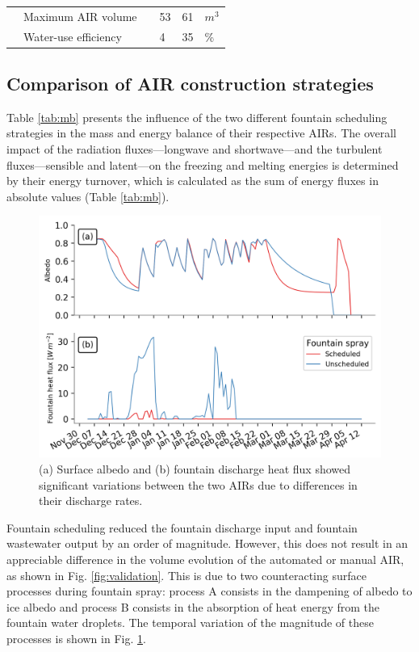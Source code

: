 \documentclass[tc, manuscript]{copernicus}
\begin{document}
\begin{table}
\begin{tabular}{@{}|llllll|@{}}
		                       & Maximum AIR volume              &                 & 53            & 61            & $m^{3}$ \\
		\multicolumn{1}{|l|}{} & Water-use efficiency            &                 & 4             & 35            & \% \\\midrule
	\end{tabular}
\end{table}

\subsection{Comparison of AIR construction strategies}

Table \ref{tab:mb} presents the influence of the two different fountain scheduling strategies in the mass and energy balance
of their respective AIRs.  The overall impact of the radiation fluxes---longwave and shortwave---and the
turbulent fluxes---sensible and latent---on the freezing and melting energies is determined by their 
energy turnover, which is calculated as the sum of energy fluxes in absolute values (Table
\ref{tab:mb}). 

\begin{figure}[htb]
\includegraphics[width=12cm]{Figures/dis_processes.png}
\caption{(a) Surface albedo  and (b) fountain discharge heat flux showed significant variations between the two
  AIRs due to differences in their discharge rates.}
\label{fig:dis_processes}
\end{figure}

Fountain scheduling reduced the fountain discharge input and fountain wastewater output by an order of
magnitude. However, this does not result in an appreciable difference in the volume evolution of the automated
or manual AIR, as shown in Fig. \ref{fig:validation}. This is due to two counteracting surface processes
during fountain spray: process A consists in the dampening of albedo to ice albedo and process B consists in the absorption of heat energy from the
fountain water droplets. The temporal variation of the magnitude of these processes is shown in Fig.
\ref{fig:dis_processes}.
\end{document}
